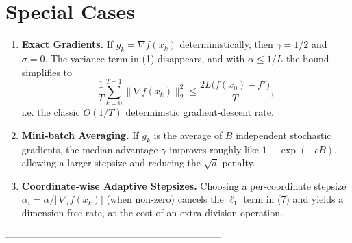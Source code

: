 \documentclass{article}
\begin{document}
\section*{Special Cases}
\begin{enumerate}
\item \textbf{Exact Gradients.}
If $g_k=\nabla f(x_k)$ deterministically, then $\gamma=1/2$ and
$\sigma=0$.  The variance term in (1) disappears, and with $\alpha\le1/L$
the bound simplifies to
\[
\frac{1}{T}\sum_{k=0}^{T-1}
\|\nabla f(x_k)\|_{2}^{2}
\le \frac{2L\big(f(x_{0})-f^{\star}\big)}{T},
\]
i.e. the classic $O(1/T)$ deterministic gradient‑descent rate.

\item \textbf{Mini‑batch Averaging.}
If $g_k$ is the average of $B$ independent stochastic gradients,
the median advantage $\gamma$ improves roughly like $1-\exp(-cB)$,
allowing a larger stepsize and reducing the $\sqrt{d}$ penalty.

\item \textbf{Coordinate‑wise Adaptive Stepsizes.}
Choosing a per‑coordinate stepsize $\alpha_i=\alpha/|\,\nabla_i f(x_k)|$ (when
non‑zero) cancels the $\ell_{1}$ term in (7) and yields a dimension‑free rate,
at the cost of an extra division operation.
\end{enumerate}

--------------------------------------------------------------------
\end{document}
